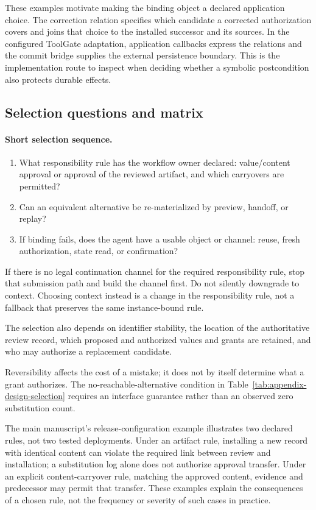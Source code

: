 These examples motivate making the binding object a declared application choice. The correction relation specifies which candidate a corrected authorization covers and joins that choice to the installed successor and its sources. In the configured ToolGate adaptation, application callbacks express the relations and the commit bridge supplies the external persistence boundary. This is the implementation route to inspect when deciding whether a symbolic postcondition also protects durable effects.

\subsection{Selection questions and matrix}
\paragraph{Short selection sequence.}
\begin{enumerate}
\item What responsibility rule has the workflow owner declared: value/content approval or approval of the reviewed artifact, and which carryovers are permitted?
\item Can an equivalent alternative be re-materialized by preview, handoff, or replay?
\item If binding fails, does the agent have a usable object or channel: reuse, fresh authorization, state read, or confirmation?
\end{enumerate}
If there is no legal continuation channel for the required responsibility rule, stop that submission path and build the channel first. Do not silently downgrade to context. Choosing context instead is a change in the responsibility rule, not a fallback that preserves the same instance-bound rule.

The selection also depends on identifier stability, the location of the authoritative review record, which proposed and authorized values and grants are retained, and who may authorize a replacement candidate.

Reversibility affects the cost of a mistake; it does not by itself determine what a grant authorizes. The no-reachable-alternative condition in Table~\ref{tab:appendix-design-selection} requires an interface guarantee rather than an observed zero substitution count.

The main manuscript's release-configuration example illustrates two declared rules, not two tested deployments. Under an artifact rule, installing a new record with identical content can violate the required link between review and installation; a substitution log alone does not authorize approval transfer. Under an explicit content-carryover rule, matching the approved content, evidence and predecessor may permit that transfer. These examples explain the consequences of a chosen rule, not the frequency or severity of such cases in practice.

